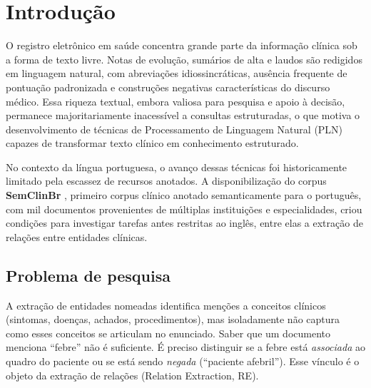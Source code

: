 \chapter[Introdução]{Introdução}
\label{cap:introducao}

O registro eletrônico em saúde concentra grande parte da informação clínica
sob a forma de texto livre. Notas de evolução, sumários de alta e laudos são
redigidos em linguagem natural, com abreviações idiossincráticas, ausência
frequente de pontuação padronizada e construções negativas características do
discurso médico. Essa riqueza textual, embora valiosa para pesquisa e apoio à
decisão, permanece majoritariamente inacessível a consultas estruturadas, o que
motiva o desenvolvimento de técnicas de Processamento de Linguagem Natural (PLN)
capazes de transformar texto clínico em conhecimento estruturado.

No contexto da língua portuguesa, o avanço dessas técnicas foi historicamente
limitado pela escassez de recursos anotados. A disponibilização do corpus
\textbf{SemClinBr} \cite{oliveira_2022_semclinbr}, primeiro corpus clínico
anotado semanticamente para o português, com mil documentos provenientes de
múltiplas instituições e especialidades, criou condições para investigar tarefas
antes restritas ao inglês, entre elas a extração de relações entre entidades
clínicas.

\section{Problema de pesquisa}

A extração de entidades nomeadas identifica menções a conceitos clínicos
(sintomas, doenças, achados, procedimentos), mas isoladamente não captura como
esses conceitos se articulam no enunciado. Saber que um documento menciona
``febre'' não é suficiente. É preciso distinguir se a febre está \emph{associada}
ao quadro do paciente ou se está sendo \emph{negada} (``paciente afebril'').
Esse vínculo é o objeto da extração de relações (\foreignlanguage{english}{Relation Extraction}, RE).

